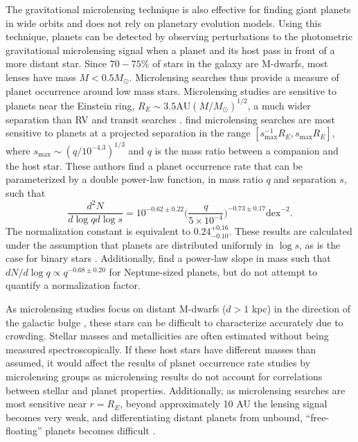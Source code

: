 The gravitational microlensing technique is also effective for finding giant planets in wide orbits and does not rely on planetary evolution models. Using this technique, planets can be detected by observing perturbations to the photometric gravitational microlensing signal when a planet and its host pass in front of a more distant star. Since $70-75\%$ of stars in the galaxy are M-dwarfs, most lenses have mass $M < 0.5 M_\odot$. Microlensing searches thus provide a measure of planet occurrence around low mass stars. Microlensing studies are sensitive to planets near the Einstein ring, $R_E \sim 3.5 \mbox{AU} (M/M_\odot)^{1/2}$, a much wider separation than RV and transit searches \citet{Gould10}. \citet{Cassan12} find microlensing searches are most sensitive to planets at a projected separation in the range $[s_{\textrm{max}}^{-1}R_E, s_{\textrm{max}}R_E]$, where $s_{\textrm{max}} \sim (q/10^{-4.3})^{1/3}$ and $q$ is the mass ratio between a companion and the host star. These authors find a planet occurrence rate that can be parameterized by a double power-law function, in mass ratio $q$ and separation $s$, such that
\begin{equation}
\frac{d^2N}{d\log q d \log s} = 10^{-0.62 \pm 0.22} \bigg(\frac{q}{5 \times 10^{-4}}\bigg)^{-0.73 \pm 0.17} \mbox{dex}^{-2}.
\label{microlensingresults}
\end{equation}
The normalization constant is equivalent to $0.24^{+0.16}_{-0.10}$. These results are calculated under the assumption that planets are distributed uniformly in $\log s$, as is the case for binary stars \citep{Opik24}. Additionally, \citet{Sumi10} find a power-law slope in mass such that $dN/ d\log q \propto q^{-0.68 \pm 0.20}$ for Neptune-sized planets, but do not attempt to quantify a normalization factor. 

As microlensing studies focus on distant M-dwarfs ($d > 1$ kpc) in the direction of the galactic bulge \citep{Gaudi02}, these stars can be difficult to characterize accurately due to crowding. Stellar masses and metallicities are often estimated without being measured spectroscopically. If these host stars have different masses than assumed, it would affect the results of planet occurrence rate studies by microlensing groups as microlensing results do not account for correlations between stellar and planet properties. Additionally, as microlensing searches are most sensitive near $r = R_E$, beyond approximately 10 AU the lensing signal becomes very weak, and differentiating distant planets from unbound, ``free-floating'' planets becomes difficult \citep{Sumi11}.

